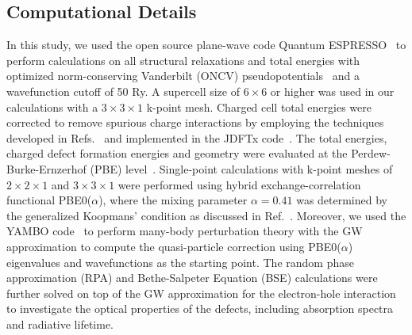 \subsection{Computational Details} In this study, we used the open source plane-wave code Quantum ESPRESSO~\cite{QE1} to perform calculations on all structural relaxations and total energies with optimized norm-conserving Vanderbilt (ONCV) pseudopotentials~\cite{ONCV1} and a wavefunction cutoff of 50 Ry. A supercell size of $6\times 6$ or higher was used in our calculations with a $3\times 3\times 1$ k-point mesh. Charged cell total energies were corrected to remove spurious charge interactions by employing the techniques developed in Refs.~\cite{PING2017JCP,wu2017first,wang2020layer} and implemented in the JDFTx code~\cite{JDFTx}.
The total energies, charged defect formation energies and geometry were evaluated at the Perdew-Burke-Ernzerhof (PBE) level~\cite{perdew1996generalized}.
Single-point calculations with k-point meshes of $2\times 2\times 1$ and $3\times 3\times 1$ were performed using hybrid exchange-correlation functional PBE0($\alpha$), where the mixing parameter $\alpha=0.41$ was determined by the generalized Koopmans’ condition as discussed in Ref.~\cite{smart2018fundamental,miceli2018nonempirical}. Moreover, we used the YAMBO code~\cite{YAMBO} to perform many-body perturbation theory with the GW approximation to compute the quasi-particle correction
using PBE0($\alpha$) eigenvalues and wavefunctions as the starting point.
The random phase approximation (RPA) and Bethe-Salpeter Equation (BSE) calculations were further solved on top of the GW approximation for the electron-hole interaction to investigate the optical properties of the defects, including absorption spectra and radiative lifetime.

